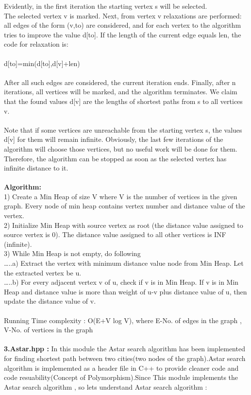 \documentclass[14pt,a4]{extreport}
\begin{document}
Evidently, in the first iteration the starting vertex s will be selected.\\

The selected vertex v is marked. Next, from vertex v relaxations are performed: all edges of the form (v,to) are considered, and for each vertex to the algorithm tries to improve the value d[to]. If the length of the current edge equals len, the code for relaxation is:
\\\\
           d[to]=min(d[to],d[v]+len)\\
           \\
After all such edges are considered, the current iteration ends. Finally, after n iterations, all vertices will be marked, and the algorithm terminates. We claim that the found values d[v] are the lengths of shortest paths from s to all vertices v.
\\\\
Note that if some vertices are unreachable from the starting vertex s, the values d[v] for them will remain infinite. Obviously, the last few iterations of the algorithm will choose those vertices, but no useful work will be done for them. Therefore, the algorithm can be stopped as soon as the selected vertex has infinite distance to it.
\\\\
\textbf{Algorithm:}\\
1) Create a Min Heap of size V where V is the number of vertices in the given graph. Every node of min heap contains vertex number and distance value of the vertex.\\
2) Initialize Min Heap with source vertex as root (the distance value assigned to source vertex is 0). The distance value assigned to all other vertices is INF (infinite).\\
3) While Min Heap is not empty, do following\\
…..a) Extract the vertex with minimum distance value node from Min Heap. Let the extracted vertex be u.\\
…..b) For every adjacent vertex v of u, check if v is in Min Heap. If v is in Min Heap and distance value is more than weight of u-v plus distance value of u, then update the distance value of v.\\
\\
Running Time complexity : O(E+V log V), where E-No. of edges in the graph , V-No. of vertices in the graph
\\\\
\textbf{3.Astar.hpp :} In this module the Astar search algorithm has been implemented for finding shortest path between two cities(two nodes of the graph).Astar search algorithm is implememted as a header file in C++ to provide cleaner code and code resuability(Concept of Polymorphism).Since This module implements the Astar search algorithm , so lets understand Astar search algorithm : 
\end{document}
